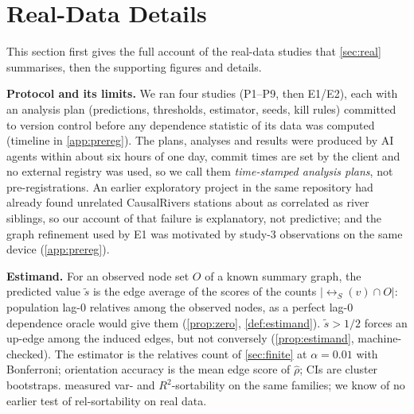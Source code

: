 \section{Real-Data Details}
\label{app:real}

This section first gives the full account of the real-data studies that
\cref{sec:real} summarises, then the supporting figures and details.

\textbf{Protocol and its limits.} We ran four studies (P1--P9, then E1/E2),
each with an analysis plan (predictions, thresholds, estimator, seeds, kill
rules) committed to version control before any dependence statistic of its
data was computed (timeline in \cref{app:prereg}). The plans, analyses and
results were produced by AI agents within about six hours of one day, commit
times are set by the client and no external registry was used, so we call
them \emph{time-stamped analysis plans}, not pre-registrations. An earlier
exploratory project in the same repository had already found unrelated
CausalRivers stations about as correlated as river siblings, so our account of
that failure is explanatory, not predictive; and the graph refinement used by
E1 was motivated by study-3 observations on the same device
(\cref{app:prereg}).

\textbf{Estimand.} For an observed node set $O$ of a known summary graph, the
predicted value $\tilde s$ is the edge average of the scores of the counts
$|\rel_S(v)\cap O|$: population lag-0 relatives among the observed nodes, as a
perfect lag-0 dependence oracle would give them (\cref{prop:zero},
\cref{def:estimand}). $\tilde s>1/2$ forces an up-edge among the induced
edges, but not conversely (\cref{prop:estimand}, machine-checked). The
estimator is the relatives count of \cref{sec:finite} at $\alpha=0.01$ with
Bonferroni; orientation accuracy is the mean edge score of $\hat\rho$; CIs are
cluster bootstraps. \citet{lohse2025sortability} measured var- and
$R^2$-sortability on the same families; we know of no earlier test of
rel-sortability on real data.

